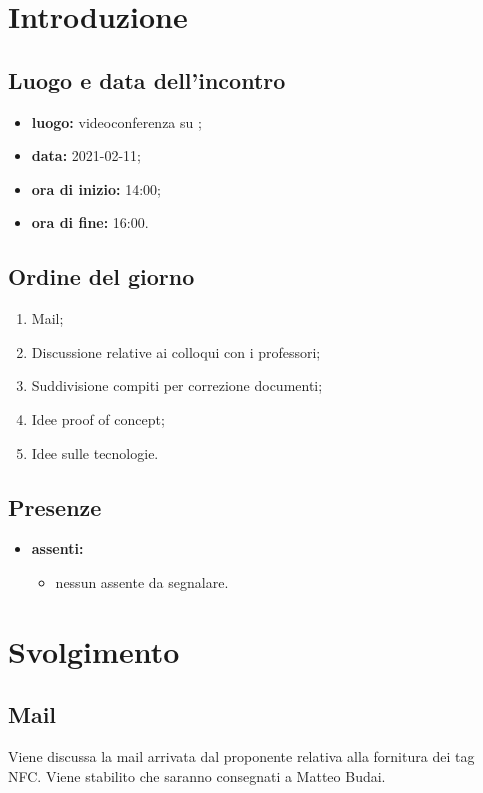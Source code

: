 \section*{Introduzione}
\subsection*{Luogo e data dell'incontro}
\begin{itemize}
\item \textbf{luogo:} videoconferenza su ;
\item \textbf{data:} 2021-02-11;
\item \textbf{ora di inizio:} 14:00;
\item \textbf{ora di fine:} 16:00.
\end{itemize}

\subsection*{Ordine del giorno}
\begin{enumerate}
	\item Mail;
	\item Discussione relative ai colloqui con i professori;
	\item Suddivisione compiti per correzione documenti;
	\item Idee proof of concept;
	\item Idee sulle tecnologie.
\end{enumerate}

\subsection*{Presenze}
\begin{itemize}
	\item \textbf{assenti:}
	\begin{itemize}
	\item nessun assente da segnalare.
	\end{itemize}
\end{itemize}

\section*{Svolgimento}
\subsection*{Mail}
Viene discussa la mail arrivata dal proponente relativa alla fornitura dei tag NFC. Viene stabilito che saranno consegnati a Matteo Budai.
